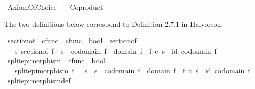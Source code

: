 %
\begin{isabellebody}%
%
%
\isadelimtheory
%
\endisadelimtheory
%
\isatagtheory
{}\isamarkupfalse%
\ Axiom{\isacharunderscore}{\kern0pt}Of{\isacharunderscore}{\kern0pt}Choice\isanewline
\ \ \ Coproduct\isanewline
{}%
\endisatagtheory
{\isafoldtheory}%
%
\isadelimtheory
%
\endisadelimtheory
%
\isadelimdocument
%
\endisadelimdocument
%
\isatagdocument
%
\isamarkuptrue%
%
\endisatagdocument
{\isafolddocument}%
%
\isadelimdocument
%
\endisadelimdocument
%
\begin{isamarkuptext}%
The two definitions below correspond to Definition 2.7.1 in Halvorson.%
\end{isamarkuptext}\isamarkuptrue%
\isamarkupfalse%
\ section{\isacharunderscore}{\kern0pt}of\ {\isacharcolon}{\kern0pt}{\isacharcolon}{\kern0pt}\ {\isachardoublequoteopen}cfunc\ {\isasymRightarrow}\ cfunc\ {\isasymRightarrow}\ bool{\isachardoublequoteclose}\ {\isacharparenleft}{\kern0pt}\ {\isachardoublequoteopen}sectionof{\isachardoublequoteclose}\ {}{}{\isacharparenright}{\kern0pt}\isanewline
\ \ \ {\isachardoublequoteopen}s\ sectionof\ f\ {\isasymlongleftrightarrow}\ s\ {\isacharcolon}{\kern0pt}\ codomain\ f\ {\isasymrightarrow}\ domain\ f\ {\isasymand}\ f\ {\isasymcirc}\isactrlsub c\ s\ {\isacharequal}{\kern0pt}\ id\ {\isacharparenleft}{\kern0pt}codomain\ f{\isacharparenright}{\kern0pt}{\isachardoublequoteclose}\isanewline
\isanewline
{}\isamarkupfalse%
\ split{\isacharunderscore}{\kern0pt}epimorphism\ {\isacharcolon}{\kern0pt}{\isacharcolon}{\kern0pt}\ {\isachardoublequoteopen}cfunc\ {\isasymRightarrow}\ bool{\isachardoublequoteclose}\isanewline
\ \ \ {\isachardoublequoteopen}split{\isacharunderscore}{\kern0pt}epimorphism\ f\ {\isasymlongleftrightarrow}\ {\isacharparenleft}{\kern0pt}{\isasymexists}\ s{\isachardot}{\kern0pt}\ \ s\ {\isacharcolon}{\kern0pt}\ codomain\ f\ {\isasymrightarrow}\ domain\ f\ {\isasymand}\ f\ {\isasymcirc}\isactrlsub c\ s\ {\isacharequal}{\kern0pt}\ id\ {\isacharparenleft}{\kern0pt}codomain\ f{\isacharparenright}{\kern0pt}{\isacharparenright}{\kern0pt}{\isachardoublequoteclose}\isanewline
\isanewline
{}\isamarkupfalse%
\ split{\isacharunderscore}{\kern0pt}epimorphism{\isacharunderscore}{\kern0pt}def{}{\isacharcolon}{\kern0pt}\ \isanewline

\end{isabellebody}
